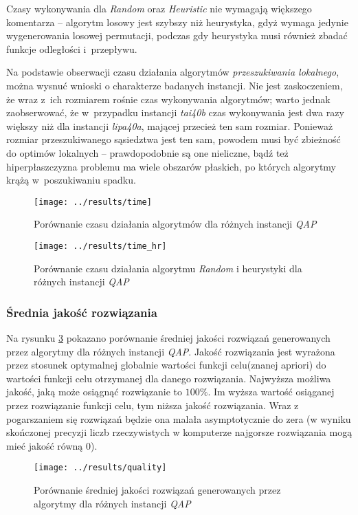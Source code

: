\documentclass{article}
\begin{document}
			Czasy wykonywania dla \emph{Random} oraz \emph{Heuristic} nie wymagają większego komentarza -- algorytm losowy jest szybszy niż heurystyka, gdyż wymaga jedynie wygenerowania losowej permutacji, podczas gdy heurystyka musi również zbadać funkcje odległości i~przepływu.


			Na podstawie obserwacji czasu działania algorytmów \emph{przeszukiwania lokalnego}, można wysnuć wnioski o charakterze badanych instancji. Nie jest zaskoczeniem, że wraz z~ich rozmiarem rośnie czas wykonywania algorytmów; warto jednak zaobserwować, że w~przypadku instancji \emph{tai40b} czas wykonywania jest dwa razy większy niż dla instancji \emph{lipa40a}, mającej przecież ten sam rozmiar. Ponieważ rozmiar przeszukiwanego sąsiedztwa jest ten sam, powodem musi być zbieżność do optimów lokalnych -- prawdopodobnie są one nieliczne, bądź też hiperpłaszczyzna problemu ma wiele obszarów płaskich, po których algorytmy krążą w~poszukiwaniu spadku.

			\begin{figure}[h]
				\texttt{[image: ../results/time]}
				\caption{Porównanie czasu działania algorytmów dla różnych instancji \emph{QAP}\label{fig:time}}
			\end{figure}
			
			\begin{figure}[h]
				\texttt{[image: ../results/time\_hr]}
				\caption{Porównanie czasu działania algorytmu \emph{Random} i heurystyki dla różnych instancji \emph{QAP}\label{fig:time_hr}}
			\end{figure}

		\subsubsection{Średnia jakość rozwiązania}Na rysunku \ref{fig:quality} pokazano porównanie średniej jakości rozwiązań generowanych przez algorytmy dla różnych instancji \emph{QAP}. Jakość rozwiązania jest wyrażona przez stosunek optymalnej globalnie wartości funkcji celu(znanej apriori) do wartości funkcji celu otrzymanej dla danego rozwiązania. Najwyższa możliwa jakość, jaką może osiągnąć rozwiązanie to $100\%$. Im wyższa wartość osiąganej przez rozwiązanie funkcji celu, tym niższa jakość rozwiązania. Wraz z pogarszaniem się rozwiązań będzie ona malała asymptotycznie do zera (w wyniku skończonej precyzji liczb rzeczywistych w komputerze najgorsze rozwiązania mogą mieć jakość równą 0).
			\begin{figure}[h]
				\texttt{[image: ../results/quality]}
				\caption{Porównanie średniej jakości rozwiązań generowanych przez algorytmy dla różnych instancji \emph{QAP}\label{fig:quality}}
			\end{figure}
\end{document}
